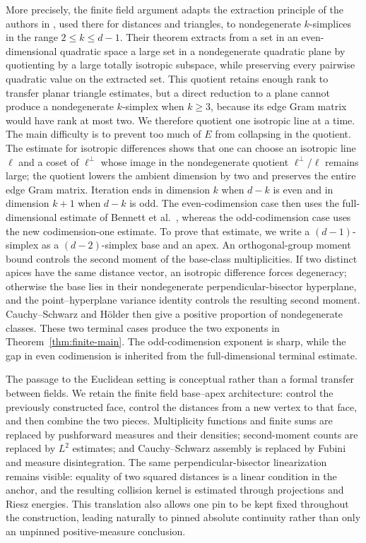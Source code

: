 \documentclass[11pt]{article}
\theoremstyle{remark}
\numberwithin{equation}{section}
\newcommand{\1}{\mathbf 1}
\begin{document}
More precisely, the finite field argument adapts the extraction principle of the authors in \cite[Theorem~1.1]{PSX}, used there for distances and
triangles, to nondegenerate \(k\)-simplices in the range
\(2\leq k\leq d-1\).  Their theorem extracts
from a set in an even-dimensional quadratic space a large set in a
nondegenerate quadratic plane by quotienting by a large totally
isotropic subspace, while preserving every pairwise quadratic value
on the extracted set.  This quotient retains enough rank to transfer
planar triangle estimates, but a direct reduction to a plane cannot
produce a nondegenerate \(k\)-simplex when \(k\geq3\), because its edge Gram
matrix would have rank at most two.  We therefore quotient one
isotropic line at a time.  The main difficulty is to prevent too much
of \(E\) from collapsing in the quotient.  The estimate for isotropic
differences shows that one can choose an isotropic line \(\ell\) and
a coset of \(\ell^\perp\) whose image in the nondegenerate quotient
\(\ell^\perp/\ell\) remains large; the quotient lowers the ambient
dimension by two and preserves the entire edge Gram matrix.  Iteration
ends in dimension \(k\) when \(d-k\) is even and in dimension \(k+1\)
when \(d-k\) is odd.  The even-codimension case then uses the
full-dimensional estimate of Bennett et al.\ \cite{BHIPR}, whereas the
odd-codimension case uses the new codimension-one estimate.  To prove
that estimate, we write a \((d-1)\)-simplex as a
\((d-2)\)-simplex base and an apex.  An orthogonal-group moment bound
controls the second moment of the base-class multiplicities.  If two
distinct apices have the same distance vector, an isotropic difference
forces degeneracy; otherwise the base lies in their nondegenerate
perpendicular-bisector hyperplane, and the point--hyperplane variance
identity controls the resulting second moment.  Cauchy--Schwarz and
H\"older then give a
positive proportion of nondegenerate classes.  These two terminal
cases produce the two exponents in Theorem~\ref{thm:finite-main}.  The
odd-codimension exponent is sharp, while the gap in even codimension
is inherited from the full-dimensional terminal estimate. 

The passage to the Euclidean setting is conceptual rather than a
formal transfer between fields.  We retain the finite field
base--apex architecture: control the previously constructed face,
control the distances from a new vertex to that face, and then combine
the two pieces.  Multiplicity functions and finite sums are replaced
by pushforward measures and their densities; second-moment counts are
replaced by \(L^2\) estimates; and Cauchy--Schwarz assembly is replaced
by Fubini and measure disintegration.  The same perpendicular-bisector
linearization remains visible: equality of two squared distances is a
linear condition in the anchor, and the resulting collision kernel is
estimated through projections and Riesz energies.  This translation
also allows one pin to be kept fixed throughout the construction,
leading naturally to pinned absolute continuity rather than only an
unpinned positive-measure conclusion.
\end{document}

